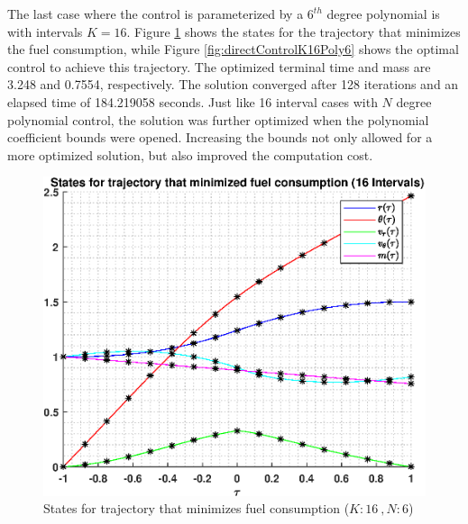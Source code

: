 \documentclass[]{article}
\begin{document}
\vspace{2mm}\newline 
The last case where the control is parameterized by a \(6^{th}\) degree polynomial is with intervals \(K = 16\). Figure \ref{fig:directStatesK16Poly6} shows the states for the trajectory that minimizes the fuel consumption, while Figure \ref{fig:directControlK16Poly6} shows the optimal control to achieve this trajectory. The optimized terminal time and mass are 3.248 and 0.7554, respectively. The solution converged after 128 iterations and an elapsed time of  184.219058 seconds. Just like 16 interval cases with \(N\) degree polynomial control, the solution was further optimized when the polynomial coefficient bounds were opened. Increasing the bounds not only allowed for a more optimized solution, but also improved the computation cost. 
\begin{figure}
	\centering
	\includegraphics[scale=0.50]{directStatesK16Poly6.eps}
	\caption{States for trajectory that minimizes fuel consumption (\(K:16\ , N:6\))}
	\label{fig:directStatesK16Poly6}
\end{figure}
\end{document}
